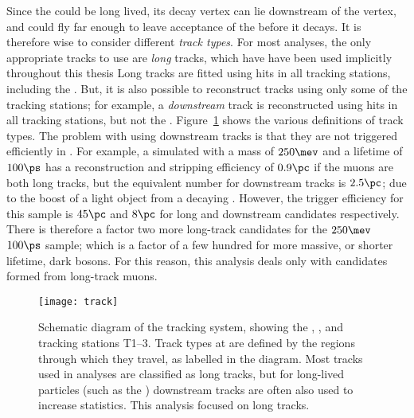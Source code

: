 Since the \db could be long lived, its decay vertex can lie downstream of the \Bd vertex, and could
fly far enough to leave acceptance of the \velo before it decays.
It is therefore wise to consider different \emph{track types}.
For most \lhcb analyses, the only appropriate tracks to use are \emph{long} tracks, which have
have been used implicitly throughout this thesis
Long tracks are fitted using hits in all tracking stations, including the \velo.
But, it is also possible to reconstruct tracks using only some of the tracking stations; for
example, a \emph{downstream} track is reconstructed using hits in all tracking stations, but not
the \velo.
Figure~\ref{fig:db:lldd} shows the various definitions of track types.
The problem with using downstream tracks is that they are not triggered efficiently in \hlttwo.
For example, a simulated \db with a mass of $250\mev$ and a lifetime of $100\ps$ has a
reconstruction and
stripping efficiency of \approx$0.9\pc$ if the muons are both long tracks, but the equivalent
number for downstream tracks is \approx$2.5\pc$; due to the boost of a light object from a decaying
\Bd.
However, the trigger efficiency for this sample is \approx$45\pc$ and $8\pc$ for long and
downstream candidates respectively.
There is therefore a factor two more long-track candidates for the $250\mev$ $100\ps$ sample; which
is a factor of a few hundred for more massive, or shorter lifetime, dark bosons.
For this reason, this analysis deals only with \db candidates formed from long-track muons.

\begin{figure}
  \begin{center}
    \texttt{[image: track]}
    \caption[Track definitions in the LHCb detector]
    {
      Schematic diagram of the \lhcb tracking system, showing the \velo, \ttracker, and tracking
      stations T1--3.
      Track types at \lhcb are defined by the regions through which they travel, as labelled in the
      diagram.
      Most tracks used in analyses are classified as long tracks, but for long-lived particles
      (such as the \KS) downstream tracks are often also used to increase statistics.
      This analysis focused on long tracks.
    }
    \label{fig:db:lldd}
  \end{center}
\end{figure}

